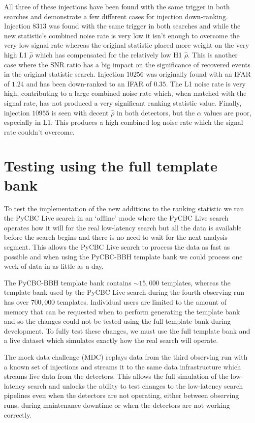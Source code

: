 %
All three of these injections have been found with the same trigger in both searches and demonstrate a few different cases for injection down-ranking. Injection $8313$ was found with the same trigger in both searches and while the new statistic's combined noise rate is very low it isn't enough to overcome the very low signal rate whereas the original statistic placed more weight on the very high L1 $\hat{\rho}$ which has compensated for the relatively low H1 $\hat{\rho}$. This is another case where the SNR ratio has a big impact on the significance of recovered events in the original statistic search. Injection $10256$ was originally found with an IFAR of $1.24$ and has been down-ranked to an IFAR of $0.35$. The L1 noise rate is very high, contributing to a large combined noise rate which, when matched with the signal rate, has not produced a very significant ranking statistic value. Finally, injection $10955$ is seen with decent $\hat{\rho}$ in both detectors, but the $\alpha$ values are poor, especially in L1. This produces a high combined log noise rate which the signal rate couldn't overcome. 

\section{\label{5:sec:mdc-test}Testing using the full template bank}

To test the implementation of the new additions to the ranking statistic we ran the PyCBC Live search in an `offline' mode where the PyCBC Live search operates how it will for the real low-latency search but all the data is available before the search begins and there is no need to wait for the next analysis segment. This allows the PyCBC Live search to process the data as fast as possible and when using the PyCBC-BBH template bank we could process one week of \gwadj data in as little as a day.

The PyCBC-BBH template bank contains ${\sim}15,000$ templates, whereas the template bank used by the PyCBC Live search during the fourth observing run has over $700,000$ templates. Individual users are limited to the amount of memory that can be requested when to perform generating the template bank and so the changes could not be tested using the full template bank during development. To fully test these changes, we must use the full template bank and a live dataset which simulates exactly how the real search will operate.

The \gwadj mock data challenge (MDC) replays data from the third observing run with a known set of injections and streams it to the same data infrastructure which streams live data from the \gwadj detectors. This allows the full simulation of the low-latency \gwadj search and unlocks the ability to test changes to the \gwadj low-latency search pipelines even when the \gwadj detectors are not operating, either between observing runs, during maintenance downtime or when the detectors are not working correctly.

